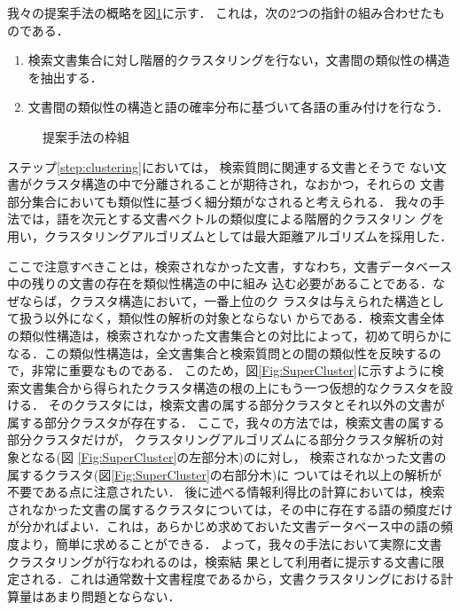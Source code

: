 我々の提案手法の概略を図\ref{Fig:Overview}に示す．
これは，次の2つの指針の組み合わせたものである．
\begin{enumerate}
 \item 検索文書集合に対し階層的クラスタリングを行ない，文書間の類似性の構造を抽出する．\label{step:clustering}
 \item 文書間の類似性の構造と語の確率分布に基づいて各語の重み付けを行なう．\label{step:weighting}
\end{enumerate}

\begin{figure}[htbp]
\begin{center}
\end{center}
\caption{提案手法の枠組}\label{Fig:Overview}
\end{figure}
ステップ\ref{step:clustering}においては，
検索質問に関連する文書とそうで
ない文書がクラスタ構造の中で分離されることが期待され，なおかつ，それらの
文書部分集合においても類似性に基づく細分類がなされると考えられる．
我々の手法では，語を次元とする文書ベクトルの類似度による階層的クラスタリン
グを用い，クラスタリングアルゴリズムとしては最大距離アルゴリズムを採用した．

ここで注意すべきことは，検索されなかった文書，すなわち，文書データベース中の残りの文書の存在を類似性構造の中に組み
込む必要があることである．なぜならば，クラスタ構造において，一番上位のク
ラスタは与えられた構造として扱う以外になく，類似性の解析の対象とならない
からである．検索文書全体の類似性構造は，検索されなかった文書集合との対比によって，初めて明らかになる．この類似性構造は，全文書集合と検索質問との間の類似性を反映するので，非常に重要なものである．
このため，図\ref{Fig:SuperCluster}に示すように検索文書集合から得られたクラスタ構造の根の上にもう一つ仮想的なクラスタを設ける．
そのクラスタには，検索文書の属する部分クラスタとそれ以外の文書が属する部分クラスタが存在する．
ここで，我々の方法では，検索文書の属する部分クラスタだけが，
クラスタリングアルゴリズムにる部分クラスタ解析の対象となる(図
\ref{Fig:SuperCluster}の左部分木)のに対し，
検索されなかった文書の属するクラスタ(図\ref{Fig:SuperCluster}の右部分木)に
ついてはそれ以上の解析が不要である点に注意されたい．
後に述べる情報利得比の計算においては，検索されなかった文書の属するクラスタについては，その中に存在する語の頻度だけが分かればよい．これは，あらかじめ求めておいた文書データベース中の語の頻度より，簡単に求めることができる．
よって，我々の手法において実際に文書クラスタリングが行なわれるのは，検索結
果として利用者に提示する文書に限定される．これは通常数十文書程度であるから，文書クラスタリングにおける計算量はあまり問題とならない．

